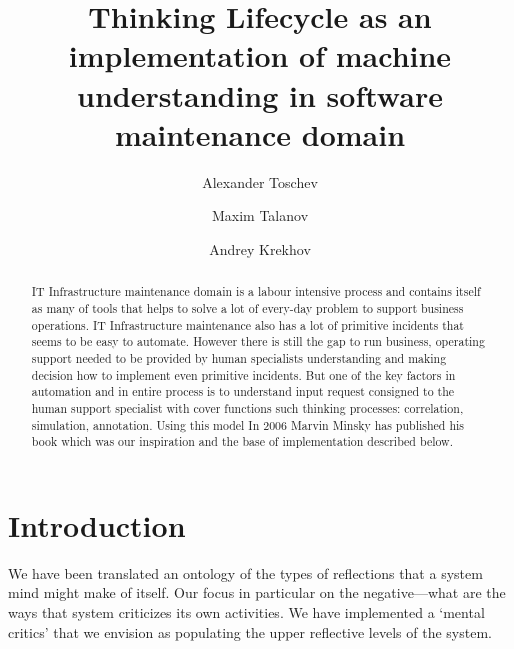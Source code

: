 \documentclass[runningheads,a4paper]{llncs}
\begin{document}
\mainmatter

\title{Thinking Lifecycle as an implementation of machine understanding in software maintenance domain}


\author{Alexander Toschev \and Maxim Talanov \and Andrey Krekhov}


\maketitle

\begin{abstract}
IT Infrastructure maintenance domain is a labour intensive process and contains itself as many of tools that helps to solve a lot of every-day problem to support business operations. IT Infrastructure maintenance also has a lot of primitive incidents that seems to be easy to automate. However there is still the gap to run business, operating support needed to be provided by human specialists understanding and making decision how to implement even primitive incidents. But one of the key factors in automation and in  entire process is to understand input request consigned to the human support specialist with cover functions such thinking processes: correlation, simulation, annotation. Using this model In 2006 Marvin Minsky has published his book \cite{minsk} which was our inspiration and the base of implementation described below.


\end{abstract}

\section{Introduction}
We have been translated an ontology of the types of reflections that a system mind might make of itself. Our focus in particular on the negative—what are the ways that system criticizes its own activities.  We have implemented a ‘mental critics’ that we envision as populating the upper reflective levels of the system. 
\end{document}
